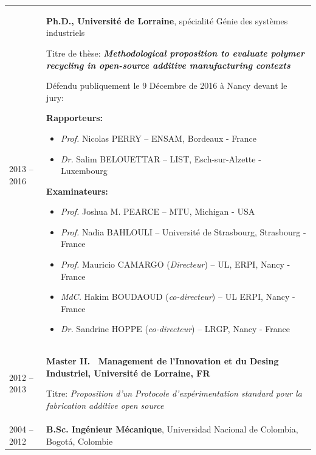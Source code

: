 \documentclass[
  12pt,
  oneside]{book}
\begin{document}
\begin{tabu} to \linewidth {X[0.4,l] X[2,l]}

2013 -- 2016 & \textbf{Ph.D., Université de Lorraine}, spécialité Génie des systèmes industriels \par
    Titre de thèse: \textbf{\emph{Methodological proposition to evaluate polymer recycling in open-source additive manufacturing contexts}} \par\vspace{5pt}
    
Défendu publiquement le 9 Décembre de 2016 à Nancy devant le jury:\par\vspace{5pt}

    \textbf{Rapporteurs:}
    \begin{itemize}
    
        \item \textit{Prof.} Nicolas PERRY --  ENSAM, Bordeaux - France
        \item \textit{Dr.} Salim BELOUETTAR -- LIST, Esch-sur-Alzette - Luxembourg
    \end{itemize}

\vspace{5pt}
    \textbf{Examinateurs:}
    \begin{itemize}
    
        \item \textit{Prof.} Joshua M. PEARCE -- MTU, Michigan - USA
        \item \textit{Prof.} Nadia BAHLOULI -- Université de Strasbourg, Strasbourg - France
        \item \textit{Prof.} Mauricio CAMARGO (\textit{Directeur}) -- UL, ERPI, Nancy - France
        
        \item \textit{MdC.} Hakim BOUDAOUD (\textit{co-directeur}) -- UL ERPI, Nancy - France
        
        \item \textit{Dr.} Sandrine HOPPE (\textit{co-directeur})  --  LRGP, Nancy - France
    \end{itemize}
        \\ [5pt]

2012 -- 2013 &
    \textbf{Master II.~ Management de l'Innovation et du Desing Industriel, Université de Lorraine, FR} \par Titre: \emph{Proposition d'un Protocole d'expérimentation standard pour la fabrication additive open source} \\[5pt]

2004 -- 2012 &
    \textbf{B.Sc. Ingénieur Mécanique}, Universidad Nacional de Colombia, Bogotá, Colombie \\
    
\end{tabu}
\end{document}
